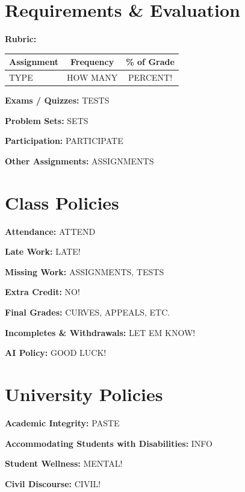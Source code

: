 \documentclass[12pt]{article}
\begin{document}
\section*{Requirements \& Evaluation}
\textbf{Rubric:}

\begin{tabular}{lcc}
    \toprule
    \toprule

    \textbf{Assignment} & \textbf{Frequency} & \textbf{\% of Grade} \\

    \hline
    \addlinespace

    TYPE & HOW MANY & PERCENT! \\

    \bottomrule
    \bottomrule
\end{tabular}
\bigbreak

\textbf{Exams / Quizzes:} TESTS

\textbf{Problem Sets:} SETS

\textbf{Participation:} PARTICIPATE

\textbf{Other Assignments:} ASSIGNMENTS

\bigbreak
\noindent\makebox[\linewidth]{\rule{0.9\paperwidth}{1pt}}


\section*{Class Policies}
\textbf{Attendance:} ATTEND

\textbf{Late Work:} LATE!

\textbf{Missing Work:} ASSIGNMENTS, TESTS

\textbf{Extra Credit:} NO!

\textbf{Final Grades:} CURVES, APPEALS, ETC.

\textbf{Incompletes \& Withdrawals:} LET EM KNOW!

\textbf{AI Policy:} GOOD LUCK!

\bigbreak
\noindent\makebox[\linewidth]{\rule{0.9\paperwidth}{1pt}}


\section*{University Policies}
\textbf{Academic Integrity:} PASTE

\textbf{Accommodating Students with Disabilities:} INFO

\textbf{Student Wellness:} MENTAL!

\textbf{Civil Discourse:} CIVIL!
\end{document}
